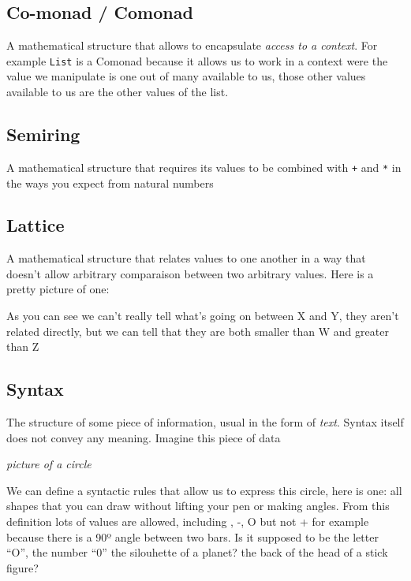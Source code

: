 \documentclass[
]{article}
\begin{document}
\hypertarget{co-monad-comonad}{%
\subsection{Co-monad / Comonad}\label{co-monad-comonad}}

A mathematical structure that allows to encapsulate \emph{access to a
context}. For example \texttt{List} is a Comonad because it allows us to
work in a context were the value we manipulate is one out of many
available to us, those other values available to us are the other values
of the list.

\hypertarget{semiring}{%
\subsection{Semiring}\label{semiring}}

A mathematical structure that requires its values to be combined with
\texttt{+} and \texttt{*} in the ways you expect from natural numbers

\hypertarget{lattice}{%
\subsection{Lattice}\label{lattice}}

A mathematical structure that relates values to one another in a way
that doesn't allow arbitrary comparaison between two arbitrary values.
Here is a pretty picture of one:

As you can see we can't really tell what's going on between X and Y,
they aren't related directly, but we can tell that they are both smaller
than W and greater than Z

\hypertarget{syntax-1}{%
\subsection{Syntax}\label{syntax-1}}

The structure of some piece of information, usual in the form of
\emph{text}. Syntax itself does not convey any meaning. Imagine this
piece of data

\emph{picture of a circle}

We can define a syntactic rules that allow us to express this circle,
here is one: all shapes that you can draw without lifting your pen or
making angles. From this definition lots of values are allowed,
including \textbar, -, O but not + for example because there is a 90º
angle between two bars. Is it supposed to be the letter ``O'', the
number ``0'' the silouhette of a planet? the back of the head of a stick
figure?
\end{document}
